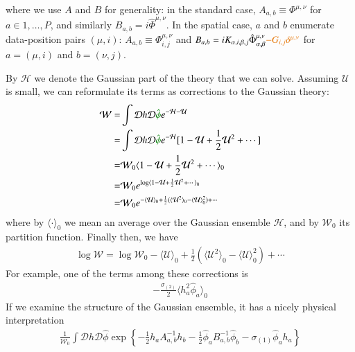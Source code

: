 \documentclass[../main.tex]{subfiles}
\begin{document}
where we use $A$ and $B$ for generality: in the standard case, $A_{a, b} \equiv \Phi^{\mu,\nu}$ for $a \in 1, \dots, P$, and similarly $B_{a,b} = i \hat \Phi^{\mu,\nu}$. In the spatial case, $a$ and $b$ enumerate data-position pairs $(\mu,i)$: $A_{a,b} \equiv \Phi^{\mu,\nu}_{i,j}$ and $B_{a,b} = i K_{\alpha,i,\beta,j} \hat \Phi^{\mu,\nu}_{\alpha,\beta} \fix{- G_{i,j} \delta^{\mu,\nu}}$ for $a=(\mu,i)$ and $b=(\nu,j)$.

By $\mathcal H$ we denote the Gaussian part of the theory that we can solve. Assuming $\mathcal U$ is small, we can reformulate its terms as corrections to the Gaussian theory:
\begin{align*}
  \mathcal W
  = & \int \mathcal D h \mathcal D \typo{\hat \phi} e^{-\mathcal H - \mathcal U} \\
  = & \int \mathcal D h \mathcal D \typo{\hat \phi} e^{- \mathcal H}[1 - \mathcal U + \frac12 \mathcal U^2 + \cdots] \\
  = & \mathcal W_0 \langle 1 - \mathcal U + \frac12 \mathcal U^2 + \cdots \rangle_0 \\
  = & \mathcal W_0 e^{\log \langle 1 - \mathcal U + \frac12 \mathcal U^2 + \cdots \rangle_0} \\
  = & \mathcal W_0 e^{-\langle \mathcal U \rangle_0 
      +\frac12 (\langle \mathcal U^2 \rangle_0 - \langle \mathcal U \rangle_0^2)
      + \cdots}
\end{align*}
where by $\langle \cdot \rangle_0$ we mean an average over the Gaussian ensemble $\mathcal H$, and by $\mathcal W_0$ its partition function. Finally then, we have
\begin{align*}
  \log \mathcal W = 
    \log \mathcal W_0 
    -\langle \mathcal U \rangle_0 
    +\frac12 (\langle \mathcal U^2 \rangle_0 - \langle \mathcal U \rangle_0^2)
    +\cdots
\end{align*}
For example, one of the terms among these corrections is
\begin{align}
  -\frac{\sigma_{(2)}}{2} \langle h_a^2 \hat \phi_a \rangle_0
  \label{eq:corrections}
\end{align}
If we examine the structure of the Gaussian ensemble, it has a nicely physical interpretation
\begin{align}
  \frac{1}{\mathcal W_0} \int \mathcal D h \mathcal D \hat \phi 
    \exp \left \{ -\frac12 h_a A^{-1}_{a,b} h_b - \frac12 \hat \phi_a B^{-1}_{a,b} \hat \phi_b - \sigma_{(1)} \hat \phi_a h_a \right \}
  \label{eq:gaussian-ensemble}
\end{align}
\end{document}
